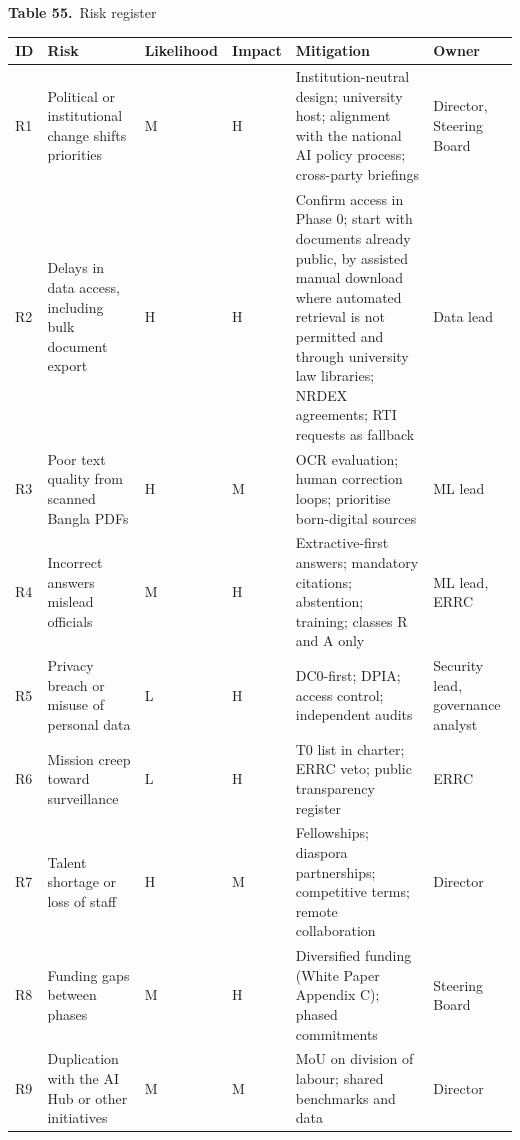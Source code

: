 \documentclass[border=10pt]{standalone}
\begin{document}
\begin{minipage}{22cm}
{\large\bfseries Table 55.}\ {\large Risk register}\par\vspace{7pt}
\small
{}
\begin{tabularx}{\linewidth}{@{}>{\hsize=0.347\hsize\raggedright\arraybackslash}X>{\hsize=1.579\hsize\raggedright\arraybackslash}X>{\hsize=0.632\hsize\raggedright\arraybackslash}X>{\hsize=0.474\hsize\raggedright\arraybackslash}X>{\hsize=2.084\hsize\raggedright\arraybackslash}X>{\hsize=0.884\hsize\raggedright\arraybackslash}X@{}}
\arrayrulecolor{bapilrule}\toprule
\rowcolor{white}\textbf{ID} & \textbf{Risk} & \textbf{Likelihood} & \textbf{Impact} & \textbf{Mitigation} & \textbf{Owner} \\
\midrule
R1 & Political or institutional change shifts priorities & M & H & Institution-neutral design; university host; alignment with the national AI policy process; cross-party briefings & Director, Steering Board \\
R2 & Delays in data access, including bulk document export & H & H & Confirm access in Phase 0; start with documents already public, by assisted manual download where automated retrieval is not permitted and through university law libraries; NRDEX agreements; RTI requests as fallback & Data lead \\
R3 & Poor text quality from scanned Bangla PDFs & H & M & OCR evaluation; human correction loops; prioritise born-digital sources & ML lead \\
R4 & Incorrect answers mislead officials & M & H & Extractive-first answers; mandatory citations; abstention; training; classes R and A only & ML lead, ERRC \\
R5 & Privacy breach or misuse of personal data & L & H & DC0-first; DPIA; access control; independent audits & Security lead, governance analyst \\
R6 & Mission creep toward surveillance & L & H & T0 list in charter; ERRC veto; public transparency register & ERRC \\
R7 & Talent shortage or loss of staff & H & M & Fellowships; diaspora partnerships; competitive terms; remote collaboration & Director \\
R8 & Funding gaps between phases & M & H & Diversified funding (White Paper Appendix C); phased commitments & Steering Board \\
R9 & Duplication with the AI Hub or other initiatives & M & M & MoU on division of labour; shared benchmarks and data & Director \\

\end{tabularx}
\end{minipage}
\end{document}
